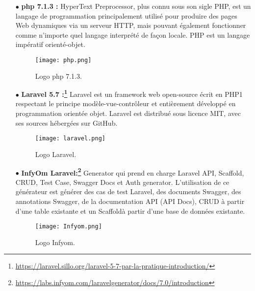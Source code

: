 \begin{itemize}
	\item[$\bullet$] \textbf{ php 7.1.3 :} 
HyperText Preprocessor, plus connu sous
son sigle PHP, est un langage de programmation
principalement utilisé pour produire des pages Web
dynamiques via un serveur HTTP, mais pouvant
également fonctionner comme n'importe quel
langage interprété de façon locale. PHP est un
langage impératif orienté-objet.\cite{wiki:PHP}
\begin{figure}[ht]
	\centering
	\texttt{[image: php.png]}
	\caption{Logo php 7.1.3.}
	\label{fig:Logo php }
\end{figure}
\FloatBarrier





	\item[$\bullet$] \textbf{ Laravel 5.7 :\footnote{ \url{https://laravel.sillo.org/laravel-5-7-par-la-pratique-introduction/} }} 
Laravel est un framework web open-source écrit en PHP1 respectant le principe modèle-vue-contrôleur et entièrement développé en programmation orientée objet. Laravel est distribué sous licence MIT, avec ses sources hébergées sur GitHub.

\cite{wiki:Laravel}
\begin{figure}[ht]
	\centering
	\texttt{[image: laravel.png]}
	\caption{Logo Laravel.}
	\label{fig:Laravel }
\end{figure}
\FloatBarrier

\medskip

	\item[$\bullet$] \textbf{ InfyOm Laravel:\footnote{ \url{https://labs.infyom.com/laravelgenerator/docs/7.0/introduction} }} 
 Generator qui prend 
en charge Laravel API, Scaffold, CRUD,
Test Case, Swagger Docs et Auth generator.
L'utilisation de ce générateur est  générer des cas de test Laravel, 
des documents Swagger, des annotations Swagger, de la documentation API (API Docs), CRUD à partir d'une table existante et un Scaffoldà partir d'une base de données existante.
\cite{wiki:Laravel}
\begin{figure}[ht]
	\centering
	\texttt{[image: Infyom.png]}
	\caption{Logo Infyom.}
	\label{fig:Infyom }
\end{figure}
\FloatBarrier
\medskip
\end{itemize}
